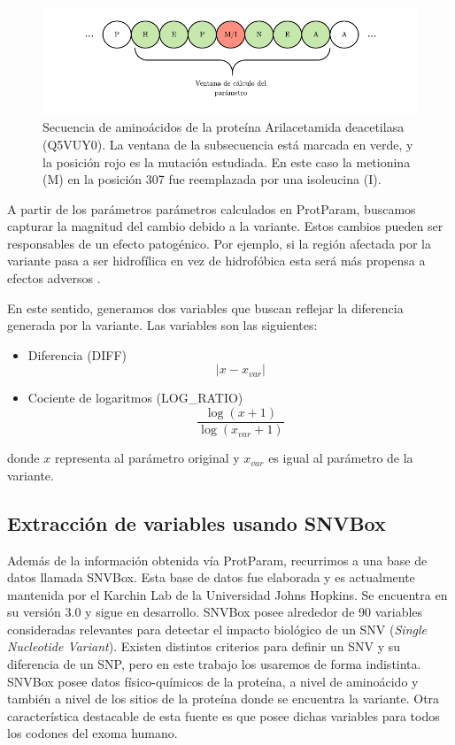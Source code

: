 \begin{figure}[H]
    \centering
    \includegraphics[scale=1.2]{documents/latex/figures/3/structural/protparam.pdf}
    \caption{Secuencia de aminoácidos de la proteína Arilacetamida deacetilasa (Q5VUY0). La ventana de la subsecuencia está marcada en verde, y la posición rojo es la mutación estudiada. En este caso la metionina (M) en la posición 307 fue reemplazada por una isoleucina (I).}
    \label{fig:sequence_window}
\end{figure}

A partir de los parámetros parámetros calculados en ProtParam, buscamos capturar la magnitud del cambio debido a la variante. Estos cambios pueden ser responsables de un efecto patogénico. Por ejemplo, si la región afectada por la variante pasa a ser hidrofílica en vez de hidrofóbica esta será más propensa a efectos adversos \cite{doi:10.1093/bioinformatics/btt308}.

En este sentido, generamos dos variables que buscan reflejar la diferencia generada por la variante. Las variables son las siguientes: 

\begin{itemize}
    \item Diferencia (DIFF) 
    $$|x - x_{var}|$$
    \item Cociente de logaritmos (LOG\_RATIO)
    $$\frac{\log{(x + 1)}}{\log{(x_{var} + 1)}}$$  
\end{itemize}

donde $x$ representa al parámetro original y $x_{var}$ es igual al parámetro de la variante.

\subsection{Extracción de variables usando SNVBox}

Además de la información obtenida vía ProtParam, recurrimos a una base de datos llamada SNVBox. Esta base de datos fue elaborada y es actualmente mantenida por el Karchin Lab de la Universidad Johns Hopkins. Se encuentra en su versión 3.0 y sigue en desarrollo. SNVBox posee alrededor de 90 variables consideradas relevantes para detectar el impacto biológico de un SNV (\textit{Single Nucleotide Variant}). Existen distintos criterios para definir un SNV y su diferencia de un SNP, pero en este trabajo los usaremos de forma indistinta. SNVBox posee datos físico-químicos de la proteína, a nivel de aminoácido y también a nivel de los sitios de la proteína donde se encuentra la variante. Otra característica destacable de esta fuente es que posee dichas variables para todos los codones del exoma humano.

